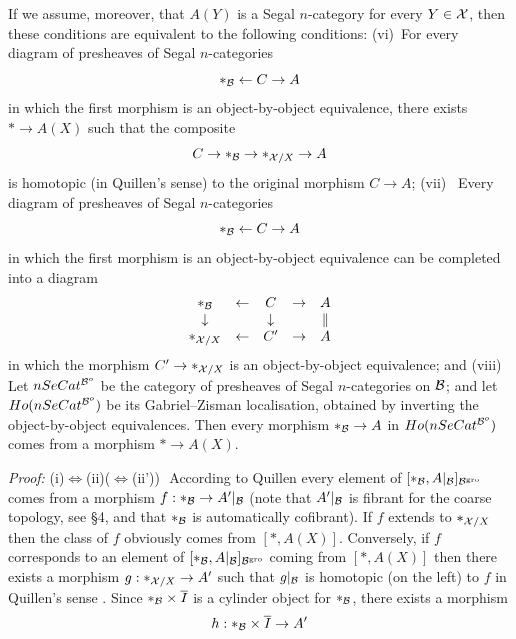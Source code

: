 \begin{lemmedefinition}
If we assume, moreover, that $A(Y)$ is a Segal $n$-category for every
$Y\in {\cal X}$, then these conditions are equivalent to the following conditions:
\newline
(vi)\, For every diagram of presheaves of Segal $n$-categories
$$
\ast _{{\cal B} } \leftarrow C \rightarrow A
$$
in which the first morphism is an object-by-object equivalence, there exists
$\ast \rightarrow A(X)$ such that the composite
$$
C\rightarrow \ast _{{\cal B}} \rightarrow \ast _{{\cal X} /X} \rightarrow A
$$
is homotopic (in Quillen's sense) to the original morphism $C\rightarrow A$;
\newline
(vii) \, Every diagram of presheaves of Segal $n$-categories
$$
\ast _{{\cal B} } \leftarrow C \rightarrow A
$$
in which the first morphism is an object-by-object equivalence can be
completed into a diagram
$$
\begin{array}{ccccc}
\ast _{{\cal B} }& \leftarrow &C &\rightarrow &A\\
\downarrow &&\downarrow && \parallel \\
\ast _{{\cal X} /X }& \leftarrow &C' &\rightarrow &A
\end{array}
$$
in which the morphism $C'\rightarrow \ast _{{\cal X} /X}$ is an object-by-object
equivalence; and
\newline
(viii)\, Let $nSeCat^{{\cal B}^o}$ be the category of presheaves of Segal
$n$-categories on ${\cal B}$; and let $Ho( nSeCat^{{\cal B}^o})$ be its Gabriel--Zisman
localisation, obtained by inverting the object-by-object equivalences. Then
every morphism $\ast _{{\cal B}}\rightarrow A$ in $Ho( nSeCat^{{\cal B}^o})$ comes from a
morphism $\ast \rightarrow A(X)$.
\end{lemmedefinition}
{\em Proof:}
\newline
(i)$\Leftrightarrow$(ii)($\Leftrightarrow$(ii'))\,\,
According to Quillen \cite{Quillen} every element of
$[\ast _{{\cal B}}, A|_{{\cal B}}]_{{\cal B} ^{\rm gro}}$ comes from a morphism
$f:\ast _{{\cal B}}\rightarrow A'|_{{\cal B} }$ (note that $A'|_{{\cal B} }$ is fibrant for
the coarse topology, see \S 4, and that $\ast_{{\cal B}}$ is automatically
cofibrant). If $f$ extends to $\ast _{{\cal X} /X}$ then the class of $f$ obviously
comes from $[\ast , A(X)]$. Conversely, if $f$ corresponds to an element of
$[\ast _{{\cal B}}, A|_{{\cal B}}]_{{\cal B} ^{\rm gro}}$ coming from $[\ast , A(X)]$ then
there exists a morphism $g:\ast _{{\cal X} /X}\rightarrow A'$ such that
$g|_{{\cal B}}$ is homotopic (on the left) to $f$ in Quillen's sense
\cite{Quillen}. Since $\ast _{{\cal B}} \times \overline{I}$ is a cylinder object
for $\ast_{{\cal B}}$, there exists a morphism $$
h: \ast _{{\cal B}} \times \overline{I}\rightarrow A'
$$
